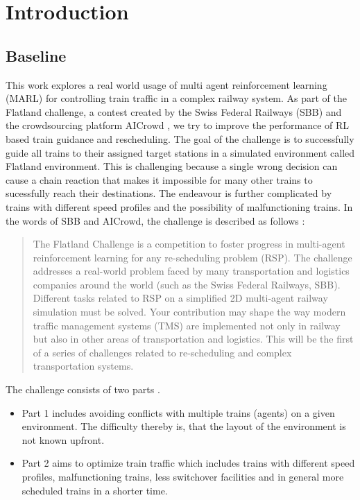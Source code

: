 \chapter{Introduction}\label{chap.einleitung}
\section{Baseline}\label{baseline}
This work explores a real world usage of multi agent reinforcement learning (MARL) for controlling train traffic in a complex railway system.
As part of the Flatland challenge, a contest created by the Swiss Federal Railways (SBB) and the crowdsourcing platform AICrowd \cite{aicrowd}, we try to improve the performance of RL based train guidance and rescheduling. The goal of the challenge is to successfully guide all trains to their assigned target stations in a simulated environment called Flatland environment.
This is challenging because a single wrong decision can cause a chain reaction that makes it impossible for many other trains to sucessfully reach their destinations. The endeavour is further complicated by trains with different speed profiles and the possibility of malfunctioning trains. In the words of SBB and AICrowd, the challenge is described as follows \cite{aicrowd}:
\begin{quote}
	The Flatland Challenge is a competition to foster progress in multi-agent reinforcement learning for any re-scheduling problem (RSP). The challenge addresses a real-world problem faced by many transportation and logistics companies around the world (such as the Swiss Federal Railways, SBB). Different tasks related to RSP on a simplified 2D multi-agent railway simulation must be solved. Your contribution may shape the way modern traffic management systems (TMS) are implemented not only in railway but also in other areas of transportation and logistics. This will be the first of a series of challenges related to re-scheduling and complex transportation systems.
\end{quote}
The challenge consists of two parts \cite{aicrowd}.  
\begin{itemize}
	\item Part 1 includes avoiding conflicts with multiple trains (agents) on a given environment. The difficulty thereby is, that the layout of the environment is not known upfront.
	\item Part 2 aims to optimize train traffic which includes trains with different speed profiles, malfunctioning trains, less switchover facilities and in general more scheduled trains in a shorter time.
\end{itemize}
